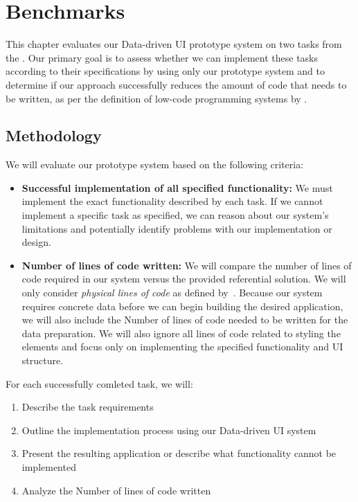 \chapter{Benchmarks}
\label{chap:walktrough}

This chapter evaluates our Data-driven UI prototype system on two tasks from the \citet{7GUIs-web}.
Our primary goal is to assess whether we can implement these tasks according to their
specifications by using only our prototype system and to determine if our approach successfully
reduces the amount of code that needs to be written,
as per the definition of low-code programming systems by \citet{Pinho_Aguiar_Amaral_2023}.

\section{Methodology}
We will evaluate our prototype system based on the following criteria:
\begin{itemize}
	\item \textbf{Successful implementation of all specified functionality:}
	      We must implement the exact functionality described by each task.
	      If we cannot implement a specific task as specified, we can reason about our system's limitations and potentially
	      identify problems with our implementation or design.

	\item \textbf{Number of lines of code written:}
	      We will compare the number of lines of code required in our system versus the provided referential solution.
	      We will only consider \emph{physical lines of code} as defined by~\citet{Park_1992}.
	      Because our system requires concrete data before we can begin building the desired application, we will also include the Number of lines of code needed to be written for the data preparation.
	      We will also ignore all lines of code related to styling the elements and focus only on implementing the specified functionality and UI structure.
\end{itemize}

For each successfully comleted task, we will:
\begin{enumerate}
	\item Describe the task requirements
	\item Outline the implementation process using our Data-driven UI system
	\item Present the resulting application or describe what functionality cannot be implemented
	\item Analyze the Number of lines of code written
\end{enumerate}

